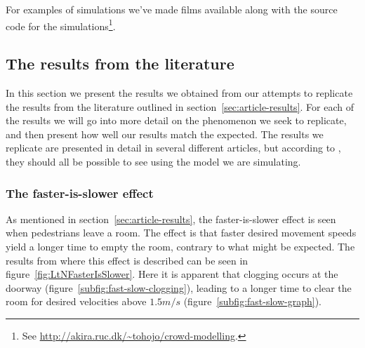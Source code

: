 For examples of simulations we've made films available along with the source 
code for the simulations\footnote{See 
\url{http://akira.ruc.dk/~tohojo/crowd-modelling}.}.

\subsection{The results from the literature}\label{subsec:ThePhenomena}
In this section we present the results we obtained from our attempts
to replicate the results from the literature outlined in 
section~\ref{sec:article-results}.  For each of the results we will go into 
more detail on the phenomenon we seek to replicate, and then present how well 
our results match the expected. The results we replicate are presented in 
detail in several different articles, but according to \cite{self-org}, they 
should all be possible to see using the model we are simulating.

\subsubsection{The faster-is-slower effect}
As mentioned in section~\ref{sec:article-results}, the faster-is-slower effect 
is seen when pedestrians leave a room. The effect is that faster desired 
movement speeds yield a longer time to empty the room, contrary to what might 
be expected. The results from \cite{helbing00} where this effect is described 
can be seen in figure~\ref{fig:LtNFasterIsSlower}. Here it is apparent that 
clogging occurs at the doorway (figure~\ref{subfig:fast-slow-clogging}), 
leading to a longer time to clear the room for desired velocities above 
$1.5m/s$ (figure~\ref{subfig:fast-slow-graph}).


